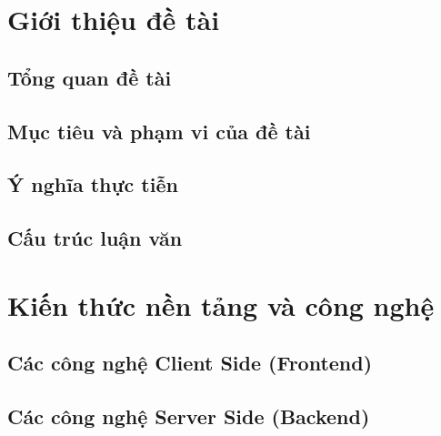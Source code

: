 \documentclass[a4paper,12pt,fleqn,print,oneside]{extarticle}
\begin{document}
\newpage
\tableofcontents




\newpage
{}
\listoffigures





\newpage
{}
\listoftables





\newpage
\section{Giới thiệu đề tài}
\subsection{Tổng quan đề tài}


\subsection{Mục tiêu và phạm vi của đề tài}


\subsection{Ý nghĩa thực tiễn}


\subsection{Cấu trúc luận văn}





\newpage
\section{Kiến thức nền tảng và công nghệ}


\subsection{Các công nghệ Client Side (Frontend)}


\subsection{Các công nghệ Server Side (Backend)}

\end{document}
